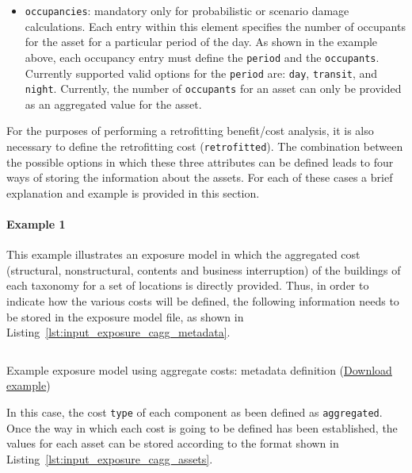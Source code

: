 \begin{itemize}
  \item \Verb+occupancies+: mandatory only for probabilistic or scenario 
    damage calculations. Each entry within this element specifies the number of
    occupants for the asset for a particular period of the day. As shown in 
    the example above, each occupancy entry must define the \Verb+period+ and 
    the \Verb+occupants+. Currently supported valid options for the 
    \Verb+period+ are: \Verb+day+, \Verb+transit+, and \Verb+night+. Currently,
    the number of \Verb+occupants+ for an asset can only be provided as an 
    aggregated value for the asset.

\end{itemize}

For the purposes of performing a retrofitting benefit/cost analysis, it
is also necessary to define the retrofitting cost (\Verb+retrofitted+). The
combination between the possible options in which these three attributes can
be defined leads to four ways of storing the information about the assets. For
each of these cases a brief explanation and example is provided in this
section.


\paragraph{Example 1}

This example illustrates an \gls{exposure model} in which the aggregated cost
(structural, nonstructural, contents and business interruption) of the
buildings of each taxonomy for a set of locations is directly provided. Thus,
in order to indicate how the various costs will be defined, the following
information needs to be stored in the exposure model file, as shown in
Listing~\ref{lst:input_exposure_cagg_metadata}.

\begin{listing}[htbp]
  \inputminted[firstline=8,firstnumber=8,lastline=18,fontsize=\footnotesize,frame=single,linenos,bgcolor=lightgray]{xml}{oqum/risk/Verbatim/input_exposure_cagg.xml}
  \caption{Example exposure model using aggregate costs: metadata definition (\href{https://raw.githubusercontent.com/GEMScienceTools/oq-engine-docs/master/oqum/risk/verbatim/input_exposure_cagg.xml}{Download example})}
  \label{lst:input_exposure_cagg_metadata}
\end{listing}

In this case, the cost \Verb+type+ of each component as been defined as
\Verb+aggregated+. Once the way in which each cost is going to be defined has
been established, the values for each asset can be stored according to the
format shown in Listing~\ref{lst:input_exposure_cagg_assets}.

